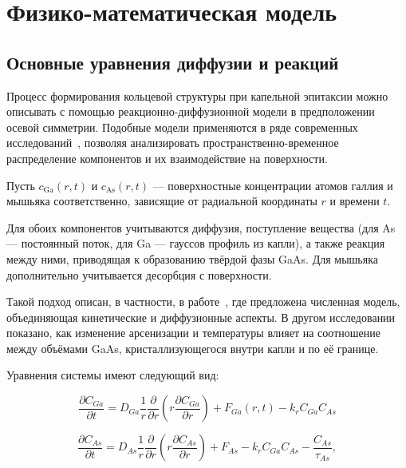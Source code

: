 \documentclass[14pt,oneside]{extarticle}
\begin{document}
\pagebreak

\section{Физико-математическая модель}

\subsection{Основные уравнения диффузии и реакций}

Процесс формирования кольцевой структуры при капельной эпитаксии можно описывать с помощью реакционно-диффузионной модели в предположении осевой симметрии. Подобные модели применяются в ряде современных исследований~\cite{reyes2013, bietti2020}, позволяя анализировать пространственно-временное распределение компонентов и их взаимодействие на поверхности.

Пусть $c_{\text{Ga}}(r,t)$ и $c_{\text{As}}(r,t)$ — поверхностные концентрации атомов галлия и мышьяка соответственно, зависящие от радиальной координаты $r$ и времени $t$.

Для обоих компонентов учитываются диффузия, поступление вещества (для As — постоянный поток, для Ga — гауссов профиль из капли), а также реакция между ними, приводящая к образованию твёрдой фазы GaAs. Для мышьяка дополнительно учитывается десорбция с поверхности.

Такой подход описан, в частности, в работе~\cite{reyes2013_1}, где предложена численная модель, объединяющая кинетические и диффузионные аспекты. В другом исследовании~\cite{bietti2020} показано, как изменение арсенизации и температуры влияет на соотношение между объёмами GaAs, кристаллизующегося внутри капли и по её границе.

Уравнения системы имеют следующий вид:

\begin{equation}
\frac{\partial C_{Ga}}{\partial t}=D_{Ga}\frac{1}{r}\frac{\partial}{\partial r}\left(r\frac{\partial C_{Ga}}{\partial r}\right)+F_{Ga}\left(r,t\right)-k_{r}C_{Ga}C_{As}
\label{eq:ga_diff}
\end{equation}

\begin{equation}
\frac{\partial C_{As}}{\partial t}=D_{As}\frac{1}{r}\frac{\partial}{\partial r}\left(r\frac{\partial C_{As}}{\partial r}\right)+F_{As}-k_{r}C_{Ga}C_{As}-\frac{C_{As}}{\tau_{As}},
\label{eq:as_diff}
\end{equation}
\end{document}
